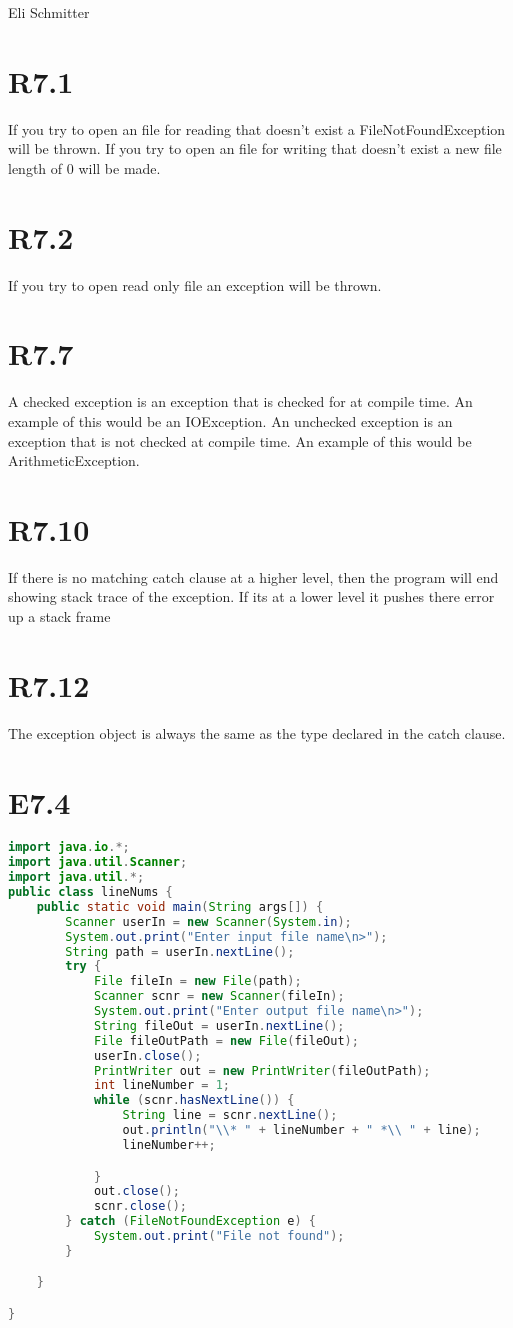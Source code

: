\documentclass{article}
\begin{document}
\begin{flushleft}
  Eli Schmitter
\end{flushleft}
\section{R7.1}
If you try to open an file for reading that doesn't exist a FileNotFoundException will be thrown. If you try to open an file for writing that doesn't exist a new file length of 0 will be made.
\section{R7.2}
If you try to open read only file an exception will be thrown.
\section{R7.7}
A checked exception is an exception that is checked for at compile time. An example of this would be an IOException.
 An unchecked exception is an exception that is not checked at compile time. An example of this would be ArithmeticException.
\section{R7.10}
If there is no matching catch clause at a higher level, then the program will end showing stack trace of the exception. If its at a lower level it pushes there error up a stack frame
\section{R7.12}
The exception object is always the same as the type declared in the catch clause.
\section{E7.4}
\begin{lstlisting}[language=Java]
import java.io.*;
import java.util.Scanner;
import java.util.*;
public class lineNums {
    public static void main(String args[]) {
        Scanner userIn = new Scanner(System.in);
        System.out.print("Enter input file name\n>");
        String path = userIn.nextLine();
        try {
            File fileIn = new File(path);
            Scanner scnr = new Scanner(fileIn);
            System.out.print("Enter output file name\n>");
            String fileOut = userIn.nextLine();
            File fileOutPath = new File(fileOut);
            userIn.close();
            PrintWriter out = new PrintWriter(fileOutPath);
            int lineNumber = 1;
            while (scnr.hasNextLine()) {
                String line = scnr.nextLine();
                out.println("\\* " + lineNumber + " *\\ " + line);
                lineNumber++;

            }
            out.close();
            scnr.close();
        } catch (FileNotFoundException e) {
            System.out.print("File not found");
        }

    }

}
\end{lstlisting}
\end{document}
